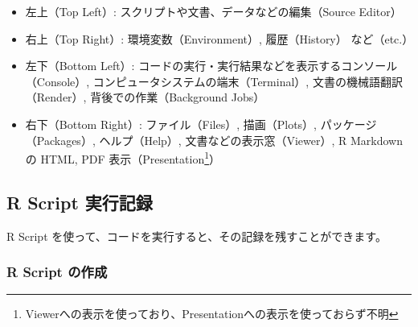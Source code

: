 \documentclass[
]{bxjsbook}
\providecommand{\tightlist}{%
  \setlength{\itemsep}{0pt}\setlength{\parskip}{0pt}}
\theoremstyle{definition}
\theoremstyle{definition}
\theoremstyle{definition}
\theoremstyle{definition}
\theoremstyle{remark}
\begin{document}
\begin{itemize}
\tightlist
\item
  左上（Top Left）: スクリプトや文書、データなどの編集（Source Editor）
\item
  右上（Top Right）: 環境変数（Environment）, 履歴（History） など（etc.）
\item
  左下（Bottom Left）: コードの実行・実行結果などを表示するコンソール（Console）, コンピュータシステムの端末（Terminal）, 文書の機械語翻訳（Render）, 背後での作業（Background Jobs）
\item
  右下（Bottom Right）: ファイル（Files）, 描画（Plots）, パッケージ（Packages）, ヘルプ（Help）, 文書などの表示窓（Viewer）, R Markdown の HTML, PDF 表示（Presentation\footnote{Viewerへの表示を使っており、Presentationへの表示を使っておらず不明}）
\end{itemize}

\hypertarget{r-script-ux5b9fux884cux8a18ux9332}{%
\subsection{R Script 実行記録}\label{r-script-ux5b9fux884cux8a18ux9332}}

R Script を使って、コードを実行すると、その記録を残すことができます。

\hypertarget{r-script-ux306eux4f5cux6210}{%
\subsubsection{R Script の作成}\label{r-script-ux306eux4f5cux6210}}
\end{document}

